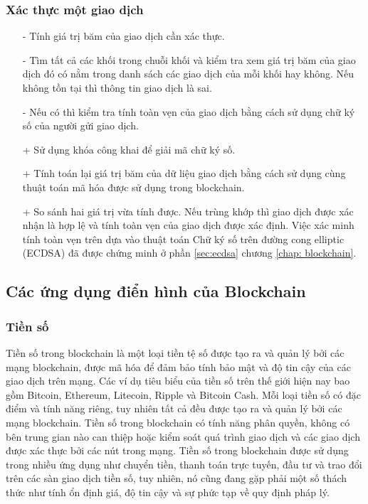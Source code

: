\subsubsection{Xác thực một giao dịch}
\begin{itemize}
    \item[-] Tính giá trị băm của giao dịch cần xác thực.
    \item[-] Tìm tất cả các khối trong chuỗi khối và kiểm tra xem giá trị băm của giao 
    dịch đó có nằm trong danh sách các giao dịch của mỗi khối hay không.
    Nếu không tồn tại thì thông tin giao dịch là sai.
    \item[-] Nếu có thì kiểm tra tính toàn vẹn của giao dịch bằng cách sử dụng chữ ký số 
    của người gửi giao dịch.
        \item[+] Sử dụng khóa công khai để giải mã chữ ký số.
        \item[+] Tính toán lại giá trị băm của dữ liệu giao dịch bằng cách sử dụng cùng
        thuật toán mã hóa được sử dụng trong blockchain.
        \item[+] So sánh hai giá trị vừa tính được. Nếu trùng khớp thì giao dịch được
        xác nhận là hợp lệ và tính toàn vẹn của giao dịch được xác định.
        Việc xác minh tính toàn vẹn trên dựa vào thuật toán Chữ ký số trên đường cong 
        elliptic (ECDSA) đã được chứng minh ở phần \ref{sec:ecdsa} chương \ref{chap: blockchain}.
\end{itemize}

\subsection{Các ứng dụng điển hình của Blockchain}
\subsubsection{Tiền số}

Tiền số trong blockchain là một loại tiền tệ số được tạo ra và quản lý bởi các 
mạng blockchain, được mã hóa để đảm bảo tính bảo mật và độ tin cậy của các giao 
dịch trên mạng. Các ví dụ tiêu biểu của tiền số trên thế giới hiện nay bao gồm 
Bitcoin, Ethereum, Litecoin, Ripple và Bitcoin Cash. Mỗi loại tiền số có đặc điểm 
và tính năng riêng, tuy nhiên tất cả đều được tạo ra và quản lý bởi các mạng 
blockchain. Tiền số trong blockchain có tính năng phân quyền, không có bên trung 
gian nào can thiệp hoặc kiểm soát quá trình giao dịch và các giao dịch được xác 
thực bởi các nút trong mạng. Tiền số trong blockchain được sử dụng trong nhiều 
ứng dụng như chuyển tiền, thanh toán trực tuyến, đầu tư và trao đổi trên các sàn 
giao dịch tiền số, tuy nhiên, nó cũng đang gặp phải một số thách thức như tính 
ổn định giá, độ tin cậy và sự phức tạp về quy định pháp lý.

